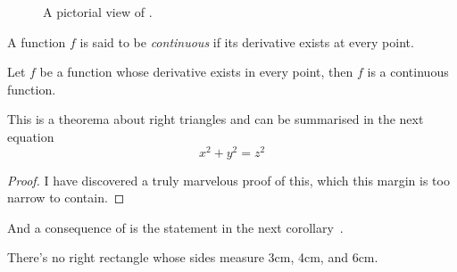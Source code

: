 \documentclass[12pt,oneside,letterpaper]{report}
\begin{document}
\begin{figure}
  \centering
  \caption{A pictorial view of .}
  \label{fig-pythagorean}
\end{figure}

\begin{definition}
  A function $f$ is said to be \emph{continuous} if its derivative exists at every point.
\end{definition}

\begin{lemma}
  Let $f$ be a function whose derivative exists in every point, then $f$ is 
  a continuous function.
\end{lemma}

\begin{theorem}
  \label{thm-pythagorean}
  This is a theorema about right triangles and can be summarised in the next 
  equation 
  \[ x^2 + y^2 = z^2 \]
\end{theorem}
\begin{proof}
  I have discovered a truly marvelous proof of this, which this margin is too narrow to contain.
\end{proof}

And a consequence of  is the statement in the next 
corollary~\cite{lamport94}.

\begin{corollary}
  There's no right rectangle whose sides measure 3cm, 4cm, and 6cm.
\end{corollary}

\lipsum[3-5]
\end{document}
